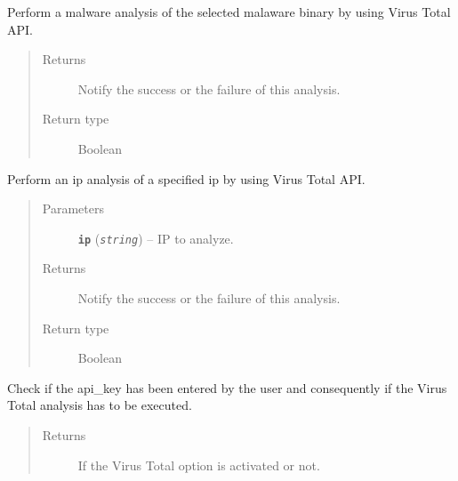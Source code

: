 \documentclass[letterpaper,10pt,oneside]{sphinxmanual}
\begin{document}
\begin{fulllineitems}
\begin{fulllineitems}
\begin{quote}
\begin{description}
\begin{itemize}
\end{itemize}

\end{description}\end{quote}

\end{fulllineitems}


\begin{fulllineitems}
\label{index:lib.vt.Vt.file_analysis}
Perform a malware analysis of the selected malaware binary by using
Virus Total API.
\begin{quote}\begin{description}
\item[{Returns}] \leavevmode
Notify the success or the failure of this analysis.

\item[{Return type}] \leavevmode
Boolean

\end{description}\end{quote}

\end{fulllineitems}


\begin{fulllineitems}
\label{index:lib.vt.Vt.ip_analysis}
Perform an ip analysis of a specified ip by using
Virus Total API.
\begin{quote}\begin{description}
\item[{Parameters}] \leavevmode
\textbf{\texttt{ip}} (\emph{\texttt{string}}) -- IP to analyze.

\item[{Returns}] \leavevmode
Notify the success or the failure of this analysis.

\item[{Return type}] \leavevmode
Boolean

\end{description}\end{quote}

\end{fulllineitems}


\begin{fulllineitems}
\label{index:lib.vt.Vt.isActivate}
Check if the api\_key has been entered by the user and consequently
if the Virus Total analysis has to be executed.
\begin{quote}\begin{description}
\item[{Returns}] \leavevmode
If the Virus Total option is activated or not.


\end{description}
\end{quote}
\end{fulllineitems}
\end{fulllineitems}
\end{document}
